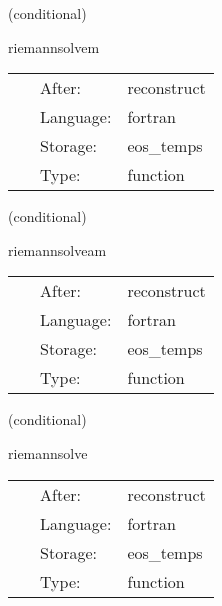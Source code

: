 \vspace{5mm}

   (conditional) 

\hspace{5mm} riemannsolvem 

\hspace{5mm}{\it solve the local riemann problems - mhd version } 


\hspace{5mm}

 \begin{tabular*}{160mm}{cll} 
~ & After:  & reconstruct \\ 
~ & Language:  & fortran \\ 
~ & Storage:  & eos\_temps \\ 
~ & Type:  & function \\ 
\end{tabular*} 


\vspace{5mm}

   (conditional) 

\hspace{5mm} riemannsolveam 

\hspace{5mm}{\it solve the local riemann problems - vector potential mhd version } 


\hspace{5mm}

 \begin{tabular*}{160mm}{cll} 
~ & After:  & reconstruct \\ 
~ & Language:  & fortran \\ 
~ & Storage:  & eos\_temps \\ 
~ & Type:  & function \\ 
\end{tabular*} 


\vspace{5mm}

   (conditional) 

\hspace{5mm} riemannsolve 

\hspace{5mm}{\it solve the local riemann problems } 


\hspace{5mm}

 \begin{tabular*}{160mm}{cll} 
~ & After:  & reconstruct \\ 
~ & Language:  & fortran \\ 
~ & Storage:  & eos\_temps \\ 
~ & Type:  & function \\ 
\end{tabular*} 


